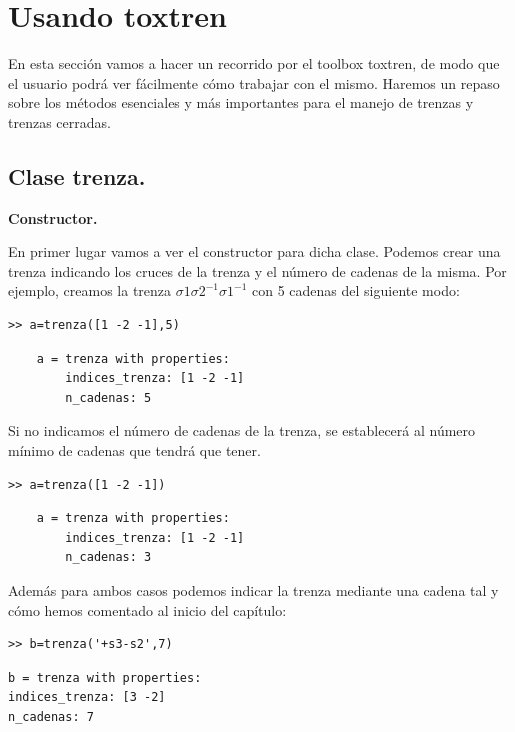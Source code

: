 \section{Usando toxtren}
En esta sección vamos a hacer un recorrido por el toolbox toxtren, de modo que el usuario podrá ver fácilmente cómo trabajar con el mismo. Haremos un repaso sobre los métodos esenciales y más importantes para el manejo de trenzas y trenzas cerradas. \\
 

\subsection{Clase trenza.}

\begin{center}
	\textbf{Constructor.}
\end{center}
En primer lugar vamos a ver el constructor para dicha clase. Podemos crear una trenza indicando los cruces de la trenza y el número de cadenas de la misma. Por ejemplo, creamos la trenza $\sigma1\sigma2^{-1}\sigma1^{-1}$ con 5 cadenas del siguiente modo:
	\lstset{language=Matlab, breaklines=true, basicstyle=\ttfamily\small}
\begin{lstlisting}
>> a=trenza([1 -2 -1],5)
\end{lstlisting}
\begin{lstlisting}
	a = trenza with properties:
	    indices_trenza: [1 -2 -1]
	    n_cadenas: 5
\end{lstlisting}

Si no indicamos el número de cadenas de la trenza, se establecerá al número mínimo de cadenas que tendrá que tener. 
\begin{lstlisting}
>> a=trenza([1 -2 -1])
\end{lstlisting}
\begin{lstlisting}
	a = trenza with properties:
	    indices_trenza: [1 -2 -1]
	    n_cadenas: 3
\end{lstlisting}

Además para ambos casos podemos indicar la trenza mediante una cadena tal y cómo hemos comentado al inicio del capítulo:

\begin{lstlisting}
>> b=trenza('+s3-s2',7)
\end{lstlisting}
\begin{lstlisting}
b = trenza with properties:
indices_trenza: [3 -2]
n_cadenas: 7
\end{lstlisting}

